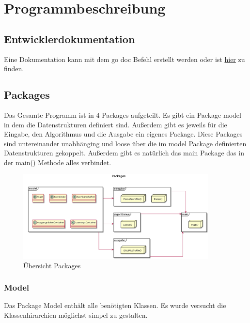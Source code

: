 \chapter{Programmbeschreibung}
\label{chap:Programmbeschreibung}

\section{Entwicklerdokumentation}

Eine Dokumentation kann mit dem go doc Befehl erstellt werden oder ist \href{https://godoc.org/github.com/J-Rocke/gropro}{hier} zu finden.

\section{Packages}

Das Gesamte Programm ist in 4 Packages aufgeteilt. Es gibt ein Package model in dem die Datenstrukturen definiert sind.
Außerdem gibt es jeweils für die Eingabe, den Algorithmus und die Ausgabe ein eigenes Package.
Diese Packages sind untereinander unabhänging und loose über die im model Package definierten Datenstrukturen gekoppelt.
Außerdem gibt es natürlich das main Package das in der main() Methode alles verbindet.

\begin{figure}[h]
    \centering
    \includegraphics[width=0.9\textwidth,]{packages.png}
    \caption[]{Übersicht Packages}
\end{figure}

\subsection{Model}

Das Package Model enthält alle benötigten Klassen. Es wurde versucht die Klassenhirarchien möglichst simpel zu gestalten.

